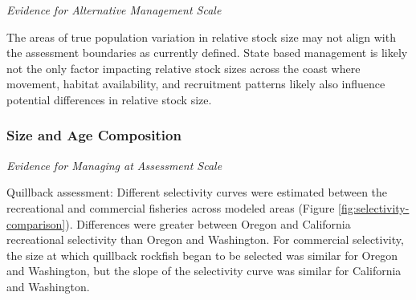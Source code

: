 \documentclass[11pt,
  english,
  letterpaper,
]{article}
\begin{document}
\tagmcend\tagstructend

\clearpage


\emph{Evidence for Alternative Management Scale}

\leavevmode\tagmcend\tagstructend\par


The areas of true population variation in relative stock size may not align with the assessment boundaries as currently defined. State based management is likely not the only factor impacting relative stock sizes across the coast where movement, habitat availability, and recruitment patterns likely also influence potential differences in relative stock size.

\leavevmode\tagmcend\tagstructend\par


\hypertarget{size-and-age-composition}{%
\subsubsection{Size and Age Composition}\label{size-and-age-composition}}

\leavevmode\tagmcend\tagstructend


\emph{Evidence for Managing at Assessment Scale}

\leavevmode\tagmcend\tagstructend\par


Quillback assessment: Different selectivity curves were estimated between the recreational and commercial fisheries across modeled areas (Figure \ref{fig:selectivity-comparison}). Differences were greater between Oregon and California recreational selectivity than Oregon and Washington. For commercial selectivity, the size at which quillback rockfish began to be selected was similar for Oregon and Washington, but the slope of the selectivity curve was similar for California and Washington.

\leavevmode\tagmcend\tagstructend\par

\end{document}
